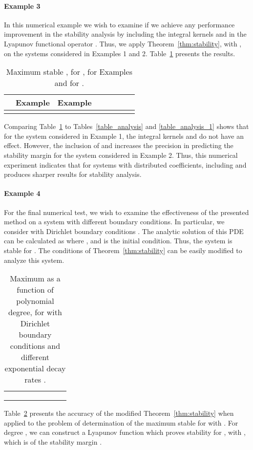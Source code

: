 \documentclass[9pt,journal,twocolumn]{IEEEtran}
\begin{document}
\paragraph*{Example 3} In this numerical example we wish to examine if we achieve any performance improvement in the stability analysis by including the integral kernels  and  in the Lyapunov functional operator . Thus, we apply Theorem~\ref{thm:stability}, with , on the systems considered in Examples 1 and 2. Table~\ref{table_comparison_analysis} presents the results.
\begin{table}{}
\begin{center}
    \begin{tabular}{l *{7}{c}}\hline \hline
 & Example  & Example  \\ \hline
 &   &  
\end{tabular}
\end{center}
\caption{Maximum stable , for , for Examples  and  for .}
\label{table_comparison_analysis}
\end{table}
 Comparing Table~\ref{table_comparison_analysis} to Tables~\ref{table_analysis} and \ref{table_analysis_1} shows that for the system considered in Example 1, the integral kernels  and  do not have an effect. However, the inclusion of  and  increases the precision in predicting the stability margin for the system considered in Example 2. Thus, this numerical experiment indicates that for systems with distributed coefficients, including  and  produces sharper results for stability analysis.

\paragraph*{Example 4} For the final numerical test, we wish to examine the effectiveness of the presented method on a system with different boundary conditions. In particular, we consider  with Dirichlet boundary conditions . The analytic solution of this PDE can be calculated as
 where ,  and  is the initial condition. Thus, the system is stable for . The conditions of Theorem~\ref{thm:stability} can be easily modified to analyze this system. 

\begin{table}{}
\begin{center}
    \begin{tabular}{l *{7}{c}}\hline \hline
 &   &  &  &  & \\ \hline
 &    &  &  &  &  \\
 &   &  &  &  &  \\
 &   &  &  &  & 
\end{tabular}
\end{center}
\caption{Maximum  as a function of polynomial degree,  for  with Dirichlet boundary conditions and different exponential decay rates .}
\label{table_analysis_dirichlet}
\end{table}
 Table~\ref{table_analysis_dirichlet} presents the accuracy of the modified Theorem~\ref{thm:stability} when applied to the problem of determination of the maximum stable  for  with . For degree , we can construct a Lyapunov function which proves stability for , with , which is  of the stability margin .
\end{document}
